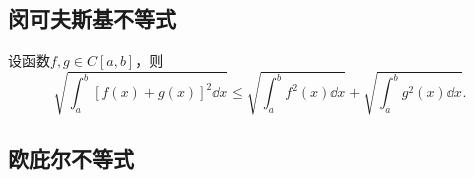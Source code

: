 \subsection{闵可夫斯基不等式}
\begin{theorem}[闵可夫斯基不等式]\label{theorem:定积分.闵可夫斯基不等式}
设函数\(f,g \in C[a,b]\)，则\begin{equation}\label{equation:定积分.闵可夫斯基不等式}
\sqrt{ \int_a^b [f(x)+g(x)]^2 \dd{x} }
\leqslant
\sqrt{ \int_a^b f^2(x) \dd{x} } + \sqrt{ \int_a^b g^2(x) \dd{x} }.
\end{equation}
\end{theorem}

\subsection{欧庇尔不等式}
